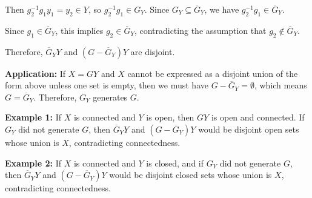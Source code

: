 Then $g_2^{-1}g_1y_1 = y_2 \in Y$, so $g_2^{-1}g_1 \in G_Y$. Since $G_Y \subseteq \overline{G}_Y$, we have $g_2^{-1}g_1 \in \overline{G}_Y$.

Since $g_1 \in \overline{G}_Y$, this implies $g_2 \in \overline{G}_Y$, contradicting the assumption that $g_2 \notin \overline{G}_Y$.

Therefore, $\overline{G}_Y Y$ and $(G - \overline{G}_Y)Y$ are disjoint.

\textbf{Application:} If $X = GY$ and $X$ cannot be expressed as a disjoint union of the form above unless one set is empty, then we must have $G - \overline{G}_Y = \emptyset$, which means $G = \overline{G}_Y$. Therefore, $G_Y$ generates $G$.

\textbf{Example 1:} If $X$ is connected and $Y$ is open, then $GY$ is open and connected. If $G_Y$ did not generate $G$, then $\overline{G}_Y Y$ and $(G - \overline{G}_Y)Y$ would be disjoint open sets whose union is $X$, contradicting connectedness.

\textbf{Example 2:} If $X$ is connected and $Y$ is closed, and if $G_Y$ did not generate $G$, then $\overline{G}_Y Y$ and $(G - \overline{G}_Y)Y$ would be disjoint closed sets whose union is $X$, contradicting connectedness.
